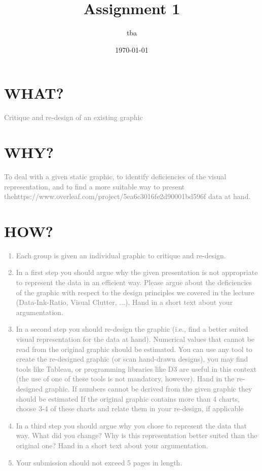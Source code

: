 \documentclass{article}
\title{Assignment 1}
\author{tba}
\date{\today}
\begin{document}
\maketitle


\section{WHAT?}

\textcolor{gray}{Critique and re-design of an existing graphic}

\section{WHY?}

\textcolor{gray}{To deal with a given static graphic, to identify deficiencies
of the visual representation, and to find a more suitable way to present thehttps://www.overleaf.com/project/5ea6c3016fe2d90001bd596f
data at hand.}

\section{HOW?}

\textcolor{gray}{
\begin{enumerate}
		\item Each group is given an individual graphic to critique and re-design.
		\item In a first step you should argue why the given presentation is not
			appropriate to represent the data in an efficient way. Please argue about
			the deficiencies of the graphic with respect to the design principles we
			covered in the lecture (Data-Ink-Ratio, Visual Clutter, ...).  Hand in a
			short text about your argumentation.
		\item In a second step you should re-design the graphic (i.e., find a better
			suited visual representation for the data at hand). Numerical values that
			cannot be read from the original graphic should be estimated. You can use
			any tool to create the re-designed graphic (or scan hand-drawn designs),
			you may find tools like Tableau, or programming libraries like D3 are
			useful in this context (the use of one of these tools is not mandatory,
			however). Hand in the re-designed graphic. If numbers cannot be derived
			from the given graphic they should be estimated If the original graphic
			contains more than 4 charts, choose 3-4 of these charts and relate them in
			your re-design, if applicable
		\item In a third step you should argue why you chose to represent the data
			that way. What did you change? Why is this representation better suited
			than the original one? Hand in a short text about your argumentation.
    \item Your submission should not exceed 5 pages in length.
\end{enumerate}}
\end{document}
